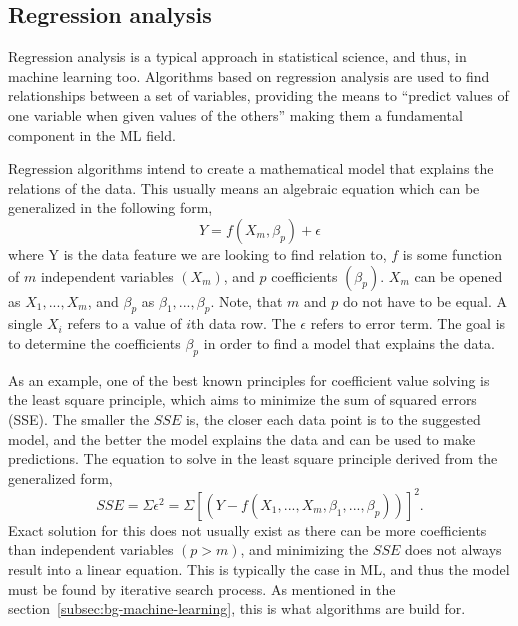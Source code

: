 
\subsection{Regression analysis}\label{subsec:bg-regression-ml}

Regression analysis is a typical approach in statistical science,
and thus, in machine learning too.
Algorithms based on regression analysis
are used to find relationships between a set of variables,
providing the means to \enquote{predict values of one variable
when given values of the others}
making them a fundamental component in the ML field.~\cite{merriam2022regression}

Regression algorithms intend to create a mathematical model
that explains the relations of the data.
This usually means an algebraic equation
which can be generalized in the following form,
\begin{equation}
    \label{eqn:general-regression-model}
    Y = f(X_{m},\beta_{p})+\epsilon
\end{equation}
where Y is the data feature we are looking to find relation to,
$f$ is some function of $m$ independent variables $(X_{m})$,
and $p$ coefficients $(\beta_{p})$.
$X_{m}$ can be opened as $X_{1},...,X_{m}$,
and $\beta_{p}$ as $\beta_{1},...,\beta_{p}$.
Note, that $m$ and $p$ do not have to be equal.
A single $X_{i}$ refers to a value of $i$th data row.
The $\epsilon$ refers to error term.
The goal is to determine the coefficients $\beta_{p}$
in order to find a model that explains the data.~\cite{freund2006regression}

As an example,
one of the best known principles for coefficient value solving
is the least square principle,
which aims to minimize the sum of squared errors (SSE).
The smaller the $SSE$ is,
the closer each data point is to the suggested model,
and the better the model explains the data
and can be used to make predictions.
The equation to solve in the least square principle
derived from the generalized form,
\begin{equation}
    \label{eqn:sum-of-squared-errors}
    SSE = \Sigma\epsilon^{2} = \Sigma[(Y-f(X_{1},...,X_{m},\beta_{1},...,\beta_{p}))]^{2}.
\end{equation}
Exact solution for this does not usually exist
as there can be more coefficients than independent variables $(p>m)$,
and minimizing the $SSE$ does not always result into a linear equation.
This is typically the case in ML,
and thus the model must be found
by iterative search process.
As mentioned in the section~\ref{subsec:bg-machine-learning},
this is what algorithms are build for.

